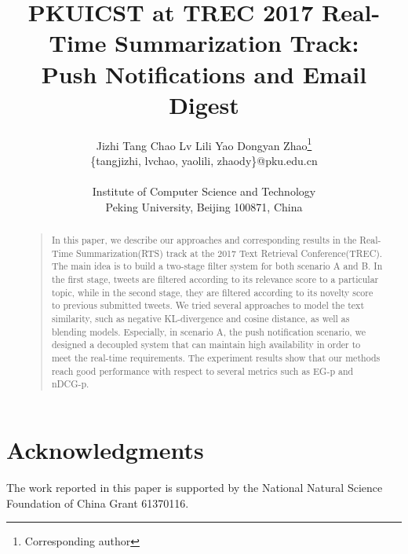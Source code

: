 \documentclass[letterpaper]{article}
\begin{document}
%
\title{PKUICST at TREC 2017 Real-Time Summarization Track:\\
Push Notifications and Email Digest
}
\author{Jizhi Tang \quad Chao Lv \quad Lili Yao \quad Dongyan Zhao\footnote{Corresponding author} \\
\{tangjizhi, lvchao, yaolili, zhaody\}@pku.edu.cn\\
\\
Institute of Computer Science and Technology\\
Peking University, Beijing 100871, China\\
}

\maketitle
\begin{abstract}
\begin{quote}
In this paper, we describe our approaches and corresponding results in the Real-Time Summarization(RTS) track at the 2017 Text Retrieval Conference(TREC).
The main idea is to build a two-stage filter system for both scenario A and B. 
In the first stage, tweets are filtered according to its relevance score to a particular topic,
while in the second stage, they are filtered according to its novelty score to previous submitted tweets.
We tried several approaches to model the text similarity, such as negative KL-divergence and cosine distance, as well as blending models.
Especially, in scenario A, the push notification scenario, we designed a decoupled system that can maintain high availability in order to meet the real-time requirements. 
The experiment results show that our methods reach good performance with respect to several metrics such as EG-p and nDCG-p.
\end{quote}
\end{abstract}






\section{Acknowledgments}
The work reported in this paper is supported by the National Natural Science Foundation of China Grant 61370116.



\end{document}
